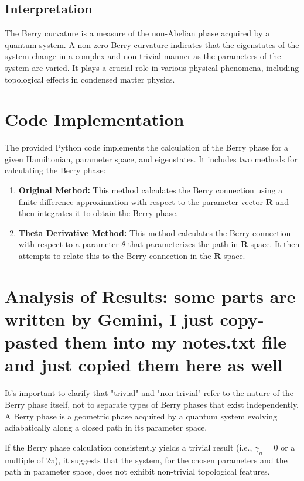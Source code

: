\documentclass{article}
\begin{document}
\subsection{Interpretation}

The Berry curvature is a measure of the non-Abelian phase acquired by a quantum system. A non-zero Berry curvature indicates that the eigenstates of the system change in a complex and non-trivial manner as the parameters of the system are varied. It plays a crucial role in various physical phenomena, including topological effects in condensed matter physics.

\section{Code Implementation}

The provided Python code implements the calculation of the Berry phase for a given Hamiltonian, parameter space, and eigenstates. It includes two methods for calculating the Berry phase:

\begin{enumerate}
    \item  \textbf{Original Method:} This method calculates the Berry connection using a finite difference approximation with respect to the parameter vector $\mathbf{R}$ and then integrates it to obtain the Berry phase.
    \item  \textbf{Theta Derivative Method:} This method calculates the Berry connection with respect to a parameter $\theta$ that parameterizes the path in $\mathbf{R}$ space. It then attempts to relate this to the Berry connection in the $\mathbf{R}$ space.
\end{enumerate}

\section{Analysis of Results: some parts are written by Gemini, I just copy-pasted them into my notes.txt file and just copied them here as well}

It's important to clarify that "trivial" and "non-trivial" refer to the nature of the Berry phase itself, not to separate types of Berry phases that exist independently. A Berry phase is a geometric phase acquired by a quantum system evolving adiabatically along a closed path in its parameter space. \cite{berry1984}

If the Berry phase calculation consistently yields a trivial result (i.e., $\gamma_n = 0$ or a multiple of $2\pi$), it suggests that the system, for the chosen parameters and the path in parameter space, does not exhibit non-trivial topological features.
\end{document}
